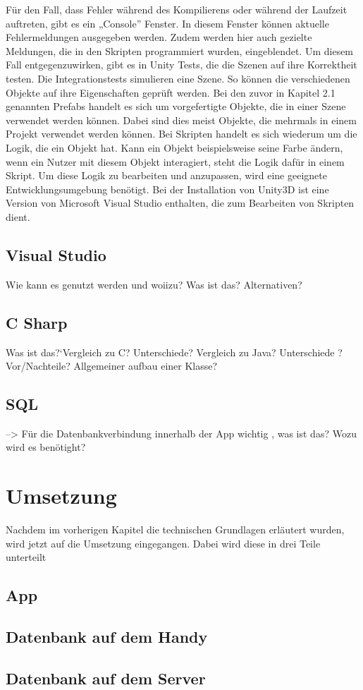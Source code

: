 Für den Fall, dass Fehler während des Kompilierens oder während der Laufzeit auftreten, gibt es ein „Console” Fenster. In diesem Fenster können aktuelle Fehlermeldungen ausgegeben werden. Zudem werden hier auch gezielte Meldungen, die in den Skripten programmiert wurden, eingeblendet. Um diesem Fall entgegenzuwirken, gibt es in Unity Tests, die die Szenen auf ihre Korrektheit testen. Die Integrationstests simulieren eine Szene. So können die verschiedenen Objekte auf ihre Eigenschaften geprüft werden. Bei den zuvor in Kapitel 2.1 genannten Prefabs handelt es sich um vorgefertigte Objekte, die in einer Szene verwendet werden können. Dabei sind dies meist Objekte, die mehrmals in einem Projekt verwendet werden können. Bei Skripten handelt es sich wiederum um die Logik, die ein Objekt hat. Kann ein Objekt beispielsweise seine Farbe ändern, wenn ein Nutzer mit diesem Objekt interagiert, steht die Logik dafür in einem Skript. Um diese Logik zu bearbeiten und anzupassen, wird eine geeignete Entwicklungsumgebung benötigt. Bei der Installation von Unity3D ist eine Version von Microsoft Visual Studio enthalten, die zum Bearbeiten von Skripten dient.

\section{Visual Studio}

	Wie kann es genutzt werden und woiizu? Was ist das? Alternativen? 

\section{C Sharp}

	Was ist das?`Vergleich zu C? Unterschiede? Vergleich zu Java? Unterschiede ? Vor/Nachteile? Allgemeiner aufbau einer Klasse? 

\section{SQL}

	--> Für die Datenbankverbindung innerhalb der App wichtig , was ist das? Wozu wird es benötight?


\chapter{Umsetzung}

	Nachdem im vorherigen Kapitel die technischen Grundlagen erläutert wurden, wird jetzt auf die Umsetzung eingegangen. Dabei wird diese in drei Teile unterteilt

\section{App}
\section{Datenbank auf dem Handy}
\section{Datenbank auf dem Server}